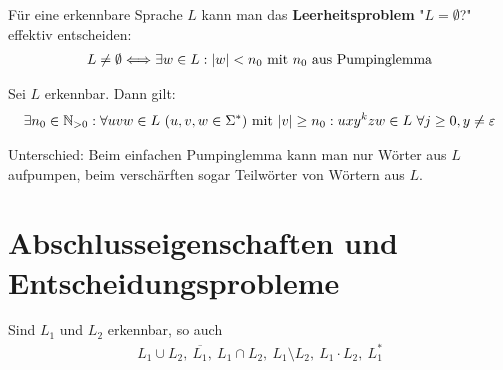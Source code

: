 \begin{satz}\label{satz3.3}
	Für eine erkennbare Sprache $L$ kann man das \textbf{Leerheitsproblem} "$L=\emptyset$?" effektiv entscheiden:
	\begin{align*}
		L\neq\emptyset\Longleftrightarrow\exists w\in L:|w|<n_0\mit n_0\text{ aus Pumpinglemma}
	\end{align*}
\end{satz}	

\begin{lemma}\enter
	Sei $L$ erkennbar.
	Dann gilt:
	\begin{align*}
		\exists n_0\in\N_{>0}:\forall uvw\in L~(u,v,w\in \Sigma^\ast)\mit|v|\geq n_0:ux y^k zw\in L~\forall j\geq0,y\neq\varepsilon
	\end{align*}
\end{lemma}

Unterschied: Beim einfachen Pumpinglemma kann man nur Wörter aus $L$ aufpumpen, beim verschärften sogar Teilwörter von Wörtern aus $L$.

\section{Abschlusseigenschaften und Entscheidungsprobleme}

\begin{satz}\label{satz4.1}\enter
	Sind $L_1$ und $L_2$ erkennbar, so auch
	\begin{align*}
		L_1\cup L_2,~\overline{L_1},~L_1\cap L_2,~L_1\setminus L_2,~L_1\cdot L_2,~L_1^\ast
	\end{align*}
\end{satz}

